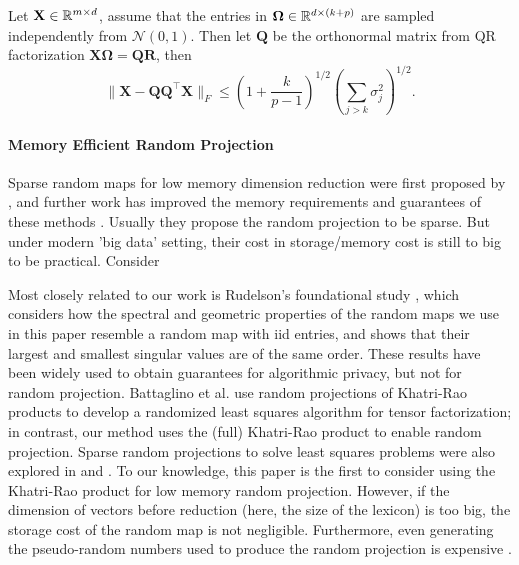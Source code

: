 \begin{lem}
	\label{lemma:gauss-rp-matrix}
	Let $\mathbf{X} \in \mathbb{R}^{m\times d}$, assume that the entries in $\mathbf{\Omega}\in \mathbb{R}^{d\times (k+p)}$ are sampled independently from $\mathcal{N}(0, 1)$. Then let  $\mathbf{Q}$  
	be the orthonormal matrix  from QR factorization $\mathbf{X\Omega} = \mathbf{QR}$, then 
	\begin{equation}
	\label{eq:gauss_col_preservation}
	 \|\mathbf{X} - \mathbf{QQ}^\top \mathbf{X}\|_F \le \left(1+\frac{k}{p-1}\right)^{1/2}\left(\sum_{j>k} \sigma_j^2\right)^{1/2}.
	\end{equation}
\end{lem}


\paragraph{Memory Efficient Random Projection}
Sparse random maps for low memory dimension reduction
were first proposed by \citep{achlioptas2003database}, 
and further work has improved the memory requirements and guarantees of these methods
\citep{li2006very, ailon2006approximate, bourgain2015toward}.  Usually they propose the random projection to be sparse.  But under modern 'big data' setting, their cost in storage/memory cost is still to big to be practical. Consider





Most closely related to our work is Rudelson's foundational study \citep{rudelson2012row},
which considers how the spectral and geometric properties of
the random maps we use in this paper resemble a random map with iid entries,
and shows that their largest and smallest singular values are of the same order.
These results have been widely used to obtain guarantees for algorithmic privacy,
but not for random projection.
Battaglino et al. \citep{battaglino2018practical} use random projections
of Khatri-Rao products to develop a randomized least squares algorithm
for tensor factorization;
in contrast, our method uses the (full) Khatri-Rao product to enable random projection.
Sparse random projections to solve least squares problems were
also explored in \citep{wang2015fast} and \citep{woodruff2014sketching}.
To our knowledge, this paper is the first to consider using the Khatri-Rao product
for low memory random projection.
However, if the dimension of vectors before reduction
(here, the size of the lexicon) is too big,
the storage cost of the random map is not negligible.
Furthermore, even generating the pseudo-random numbers used to produce the random projection
is expensive \citep{matsumoto1998mersenne}.

